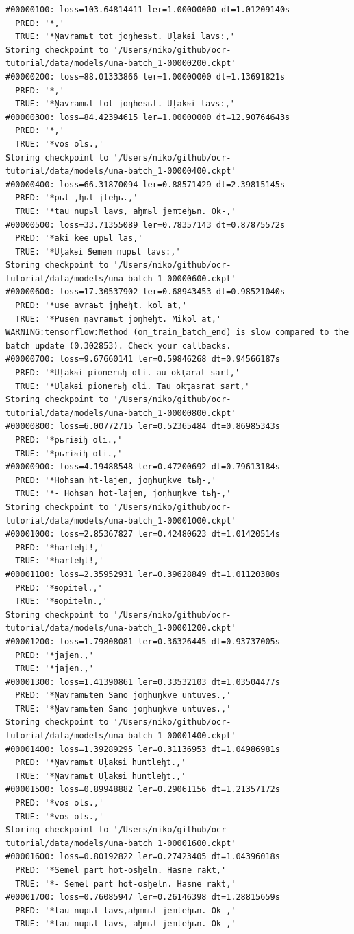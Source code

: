 \documentclass[]{book}
\begin{document}
\begin{verbatim}
#00000100: loss=103.64814411 ler=1.00000000 dt=1.01209140s
  PRED: '*,'
  TRUE: '*Ņavramьt tot joŋhesьt. Uļakꞩi lavs:,'
Storing checkpoint to '/Users/niko/github/ocr-tutorial/data/models/una-batch_1-00000200.ckpt'
#00000200: loss=88.01333866 ler=1.00000000 dt=1.13691821s
  PRED: '*,'
  TRUE: '*Ņavramьt tot joŋhesьt. Uļakꞩi lavs:,'
#00000300: loss=84.42394615 ler=1.00000000 dt=12.90764643s
  PRED: '*,'
  TRUE: '*vos ols.,'
Storing checkpoint to '/Users/niko/github/ocr-tutorial/data/models/una-batch_1-00000400.ckpt'
#00000400: loss=66.31870094 ler=0.88571429 dt=2.39815145s
  PRED: '*pьl ,ꜧьl jteꜧь.,'
  TRUE: '*tau nupьl lavs, aꜧmьl jemteꜧьn. Ok-,'
#00000500: loss=33.71355089 ler=0.78357143 dt=0.87875572s
  PRED: '*aki kee upьl las,'
  TRUE: '*Uļakꞩi Ꞩemen nupьl lavs:,'
Storing checkpoint to '/Users/niko/github/ocr-tutorial/data/models/una-batch_1-00000600.ckpt'
#00000600: loss=17.30537902 ler=0.68943453 dt=0.98521040s
  PRED: '*use avraьt jŋheꜧt. kol at,'
  TRUE: '*Pusen ņavramьt joŋheꜧt. Mikol at,'
WARNING:tensorflow:Method (on_train_batch_end) is slow compared to the batch update (0.302853). Check your callbacks.
#00000700: loss=9.67660141 ler=0.59846268 dt=0.94566187s
  PRED: '*Uļakꞩi pionerьꜧ oli. au okţarat sart,'
  TRUE: '*Uļakꞩi pionerьꜧ oli. Tau okţaвrat sart,'
Storing checkpoint to '/Users/niko/github/ocr-tutorial/data/models/una-batch_1-00000800.ckpt'
#00000800: loss=6.00772715 ler=0.52365484 dt=0.86985343s
  PRED: '*pьriꞩiꜧ oli.,'
  TRUE: '*pьriꞩiꜧ oli.,'
#00000900: loss=4.19488548 ler=0.47200692 dt=0.79613184s
  PRED: '*Hohsan ht-lajen, joŋhuŋkve tьꜧ-,'
  TRUE: '*- Hohsan hot-lajen, joŋhuŋkve tьꜧ-,'
Storing checkpoint to '/Users/niko/github/ocr-tutorial/data/models/una-batch_1-00001000.ckpt'
#00001000: loss=2.85367827 ler=0.42480623 dt=1.01420514s
  PRED: '*harteꜧt!,'
  TRUE: '*harteꜧt!,'
#00001100: loss=2.35952931 ler=0.39628849 dt=1.01120380s
  PRED: '*ꞩopitel.,'
  TRUE: '*ꞩopiteln.,'
Storing checkpoint to '/Users/niko/github/ocr-tutorial/data/models/una-batch_1-00001200.ckpt'
#00001200: loss=1.79808081 ler=0.36326445 dt=0.93737005s
  PRED: '*jajen.,'
  TRUE: '*jajen.,'
#00001300: loss=1.41390861 ler=0.33532103 dt=1.03504477s
  PRED: '*Ņavramьten Sano joŋhuŋkve untuves.,'
  TRUE: '*Ņavramьten Sano joŋhuŋkve untuves.,'
Storing checkpoint to '/Users/niko/github/ocr-tutorial/data/models/una-batch_1-00001400.ckpt'
#00001400: loss=1.39289295 ler=0.31136953 dt=1.04986981s
  PRED: '*Ņavramьt Uļakꞩi huntleꜧt.,'
  TRUE: '*Ņavramьt Uļakꞩi huntleꜧt.,'
#00001500: loss=0.89948882 ler=0.29061156 dt=1.21357172s
  PRED: '*vos ols.,'
  TRUE: '*vos ols.,'
Storing checkpoint to '/Users/niko/github/ocr-tutorial/data/models/una-batch_1-00001600.ckpt'
#00001600: loss=0.80192822 ler=0.27423405 dt=1.04396018s
  PRED: '*Semel part hot-osꜧeln. Hasne rakt,'
  TRUE: '*- Semel part hot-osꜧeln. Hasne rakt,'
#00001700: loss=0.76085947 ler=0.26146398 dt=1.28815659s
  PRED: '*tau nupьl lavs,aꜧmmьl jemteꜧьn. Ok-,'
  TRUE: '*tau nupьl lavs, aꜧmьl jemteꜧьn. Ok-,'
\end{verbatim}
\end{document}
